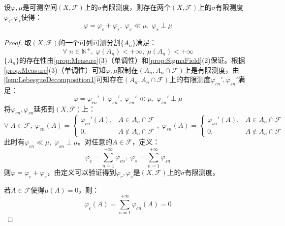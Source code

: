 \begin{lemma}\label{lem:LebesgueDecomposition2}
	设$\varphi,\mu$是可测空间$(X,\mathscr{F})$上的$\sigma$有限测度，则存在两个$(X,\mathscr{F})$上的$\sigma$有限测度$\varphi_c,\varphi_s$使得：
	\begin{equation*}
		\varphi=\varphi_c+\varphi_s,\;\varphi_c\ll\mu,\;\varphi_s\perp\mu
	\end{equation*}
\end{lemma}
\begin{proof}
	取$(X,\mathscr{F})$的一个可列可测分割$\{A_n\}$满足：
	\begin{equation*}
		\forall\;n\in\mathbb{N}^+,\;\varphi(A_n)<+\infty,\;\mu(A_n)<+\infty
	\end{equation*}
	$\{A_n\}$的存在性由\cref{prop:Measure}(3)（单调性）和\cref{prop:SigmaField}(2)保证。根据\cref{prop:Measure}(3)（单调性）可知$\varphi,\mu$限制在$(A_n,A_n\cap\mathscr{F})$上是有限测度，由\cref{lem:LebesgueDecomposition1}可知存在$(A_n,A_n\cap\mathscr{F})$上的有限测度$\varphi_{cn}',\varphi_{sn}'$满足：
	\begin{equation*}
		\varphi=\varphi_{cn}'+\varphi_{sn}',\;\varphi_{cn}'\ll\mu,\;\varphi_{sn}'\perp\mu
	\end{equation*}
	将$\varphi_{cn},\varphi_{sn}$延拓到$(X,\mathscr{F})$上：
	\begin{equation*}
		\forall\;A\in\mathscr{F},\;
		\varphi_{cn}(A)=
		\begin{cases}
			\varphi_{cn}'(A),&A\in A_n\cap\mathscr{F} \\
			0,&A\notin A_n\cap \mathscr{F}
		\end{cases},\;
		\varphi_{sn}(A)=
		\begin{cases}
			\varphi_{sn}'(A),&A\in A_n\cap\mathscr{F} \\
			0,&A\notin A_n\cap \mathscr{F}
		\end{cases}
	\end{equation*}
	此时有$\varphi_{cn}\ll\mu,\;\varphi_{sn}\perp\mu$。对任意的$A\in\mathscr{F}$，定义：
	\begin{equation*}
		\varphi_c=\sum_{n=1}^{+\infty}\varphi_{cn},\;\varphi_s=\sum_{n=1}^{+\infty}\varphi_{sn}
	\end{equation*}
	则$\varphi=\varphi_c+\varphi_s$，由定义可以验证得到$\varphi_c,\varphi_s$是$(X,\mathscr{F})$上的$\sigma$有限测度。\par
	若$A\in\mathscr{F}$使得$\mu(A)=0$，则：
	\begin{equation*}
		\varphi_c(A)=\sum_{n=1}^{+\infty}\varphi_{cn}(A)=0
	\end{equation*}

\end{proof}
